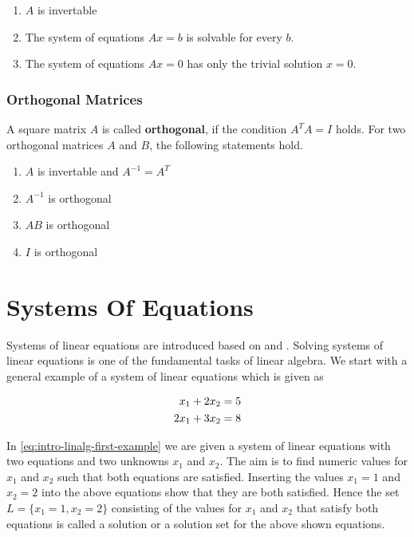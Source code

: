 \documentclass[
]{book}
\providecommand{\tightlist}{%
  \setlength{\itemsep}{0pt}\setlength{\parskip}{0pt}}
\theoremstyle{definition}
\theoremstyle{definition}
\theoremstyle{definition}
\theoremstyle{remark}
\begin{document}
\begin{enumerate}
\def\labelenumi{\arabic{enumi}.}
\tightlist
\item
  \(A\) is invertable
\item
  The system of equations \(Ax = b\) is solvable for every \(b\).
\item
  The system of equations \(Ax = 0\) has only the trivial solution \(x=0\).
\end{enumerate}

\hypertarget{intro-linalg-orthogonal-matrix}{%
\subsubsection{Orthogonal Matrices}\label{intro-linalg-orthogonal-matrix}}

A square matrix \(A\) is called \textbf{orthogonal}, if the condition \(A^TA = I\) holds. For two orthogonal matrices \(A\) and \(B\), the following statements hold.

\begin{enumerate}
\def\labelenumi{\arabic{enumi}.}
\tightlist
\item
  \(A\) is invertable and \(A^{-1} = A^T\)
\item
  \(A^{-1}\) is orthogonal
\item
  \(AB\) is orthogonal
\item
  \(I\) is orthogonal
\end{enumerate}

\hypertarget{intro-linalg-systems-of-equations}{%
\section{Systems Of Equations}\label{intro-linalg-systems-of-equations}}

Systems of linear equations are introduced based on \citep{Nipp2002} and \citep{Searle1971}. Solving systems of linear equations is one of the fundamental tasks of linear algebra. We start with a general example of a system of linear equations which is given as

\begin{align}
 x_1 + 2x_2 &= 5 \notag \\
2x_1 + 3x_2 &= 8
\label{eq:intro-linalg-first-example}
\end{align}

In \eqref{eq:intro-linalg-first-example} we are given a system of linear equations with two equations and two unknowns \(x_1\) and \(x_2\). The aim is to find numeric values for \(x_1\) and \(x_2\) such that both equations are satisfied. Inserting the values \(x_1 = 1\) and \(x_2 = 2\) into the above equations show that they are both satisfied. Hence the set \(L = \{x_1 = 1, x_2 = 2\}\) consisting of the values for \(x_1\) and \(x_2\) that satisfy both equations is called a solution or a solution set for the above shown equations.
\end{document}
